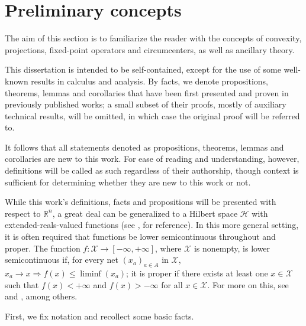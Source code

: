 \documentclass[smallextended,numbook,nospthms]{svjour3}
\theoremstyle{plain}
\theoremstyle{definition}
\def\RR{\mathds R}
\begin{document}
\newpage
\section{Preliminary concepts}\label{sec:prelim}
The aim of this section is to familiarize the reader with the concepts of convexity, projections, fixed-point operators and circumcenters, as well as ancillary theory.     

This dissertation is intended to be self-contained, except for the use of some well-known results in calculus and analysis. By facts, we denote propositions, theorems, lemmas and corollaries that have been first presented and proven in previously published works; a small subset of their proofs, mostly of auxiliary technical results, will be omitted, in which case the original proof will be referred to.

It follows that all statements denoted as propositions, theorems, lemmas and corollaries are new to this work. For ease of reading and understanding, however, definitions will be called as such regardless of their authorship, though context is sufficient for determining whether they are new to this work or not.

While this work's definitions, facts and propositions will be presented with respect to $\RR^n$, a great deal can be generalized to a Hilbert space $\mathcal{H}$ with extended-reals-valued functions (see \cite{BC2011, Rockafellar:1996}, for reference). In this more general setting, it is often required that functions be lower semicontinuous throughout and proper. The function $f:\mathcal{X} \rightarrow [-\infty,+\infty]$, where $\mathcal{X}$ is nonempty, is lower semicontinuous if, for every net $\left(x_{a}\right)_{a \in A}$ in $\mathcal{X}$, $x_{a} \rightarrow x \Rightarrow f(x) \leq \liminf \left(x_{a}\right)$; it is proper if there exists at least one $x \in \mathcal{X}$ such that  $f(x)<+\infty$ and $f(x)>-\infty$ for all $x \in \mathcal{X}$.  For more on this, see \cite[Sections 7 and 30]{Rockafellar:1996} and \cite[Chapter 1 and 9]{BC2011}, among others.

First, we fix notation and recollect some basic facts. 
\end{document}
